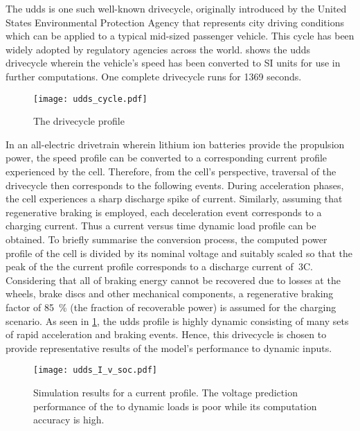 The \gls{udds} is  one such well-known drivecycle, originally  introduced by the
United  States  Environmental Protection  Agency  that  represents city  driving
conditions which can  be applied to a typical mid-sized  passenger vehicle. This
cycle  has  been  widely  adopted  by  regulatory  agencies  across  the  world.
  shows  the  \gls{udds} drivecycle  wherein  the
vehicle's speed has been converted to  SI units for use in further computations.
One complete drivecycle runs for 1369 seconds.

\begin{figure}[!htbp]
    \centering
    \texttt{[image: udds\_cycle.pdf]}
    \caption{The  drivecycle profile}
    \label{fig:uddsspeedvstimecycle}
\end{figure}

In  an  all-electric  drivetrain  wherein  lithium  ion  batteries  provide  the
propulsion power, the speed profile can  be converted to a corresponding current
profile  experienced  by  the  cell. Therefore,  from  the  cell's  perspective,
traversal of  the drivecycle  then corresponds to  the following  events. During
acceleration phases,  the cell experiences  a sharp discharge spike  of current.
Similarly,  assuming that  regenerative braking  is employed,  each deceleration
event corresponds to a charging current. Thus a current versus time dynamic load
profile  can be  obtained.  To  briefly summarise  the  conversion process,  the
computed  power profile  of  the cell  is  divided by  its  nominal voltage  and
suitably scaled  so that the  peak of the the  current profile corresponds  to a
discharge  current of~3C.  Considering that  all of  braking  energy cannot  be
recovered  due  to losses  at  the  wheels,  brake  discs and  other  mechanical
components,  a regenerative  braking factor  of \SI{85}{\percent}  (the fraction
of  recoverable  power)  is  assumed  for the  charging  scenario.  As  seen  in
\cref{fig:uddsspeedvstimecycle},  the  \gls{udds}   profile  is  highly  dynamic
consisting  of  many sets  of  rapid  acceleration  and braking  events.  Hence,
this  drivecycle is  chosen to  provide  representative results  of the  model's
performance to dynamic inputs.


\begin{figure}[!htbp]
    \centering
    \texttt{[image: udds\_I\_v\_soc.pdf]} %
    \caption[Simulation results of  and 
    models to  current profile]{Simulation results for a
         current profile. The voltage prediction performance
        of the  to dynamic loads is poor while its
     computation accuracy is high.}
    \label{fig:uddssimp2dspmresults}
\end{figure}


